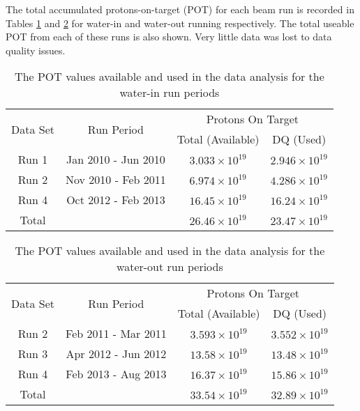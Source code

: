 The total accumulated protons-on-target (POT) for each beam run is recorded in Tables \ref{tab:DataSamplesRun1Run2Run4} and \ref{tab:DataSamplesRun2airRun3airRun4air} for water-in and water-out running respectively. The total useable POT from each of these runs is also shown. Very little data was lost to data quality issues.

\begin{table}[h]
\centering
\caption{The POT values available and used in the data analysis for 
the water-in run periods}
\begin{tabular}{cccc}\toprule
\multirow{2}{*}{Data Set} & \multirow{2}{*}{Run Period} & \multicolumn{2}{c}{Protons On Target}\\
 & & Total (Available) & DQ (Used) \\
\hline
Run 1 & Jan 2010 - Jun 2010 & $3.033\times 10^{19}$ & $2.946 \times 10^{19}$\\ 
Run 2 & Nov 2010 - Feb 2011 & $6.974\times 10^{19}$ & $4.286 \times 10^{19}$\\ 
Run 4 & Oct 2012 - Feb 2013 & $16.45\times 10^{19}$ & $16.24 \times 10^{19}$\\ 
\hline
Total &  & $26.46 \times 10^{19}$ & $23.47 \times 10^{19}$ \\ 
\bottomrule
\end{tabular} 
\label{tab:DataSamplesRun1Run2Run4} %
\end{table}

\begin{table}[h]
\centering
\caption{The POT values available and used in the data analysis for 
the water-out run periods}
\begin{tabular}{cccc}\toprule
\multirow{2}{*}{Data Set} & \multirow{2}{*}{Run Period} & \multicolumn{2}{c}{Protons On Target}\\
 & & Total (Available) & DQ (Used) \\
\hline
Run 2 & Feb 2011 - Mar 2011 & $3.593\times 10^{19}$ & $3.552 \times 10^{19}$\\ 
Run 3 & Apr 2012 - Jun 2012 & $13.58\times 10^{19}$ & $13.48 \times 10^{19}$\\ 
Run 4 & Feb 2013 - Aug 2013 & $16.37\times 10^{19}$ & $15.86 \times 10^{19}$\\ 
\hline
Total &  & $33.54 \times 10^{19}$ & $32.89 \times 10^{19}$ \\ 
\bottomrule
\end{tabular} 
\label{tab:DataSamplesRun2airRun3airRun4air} %
\end{table}

